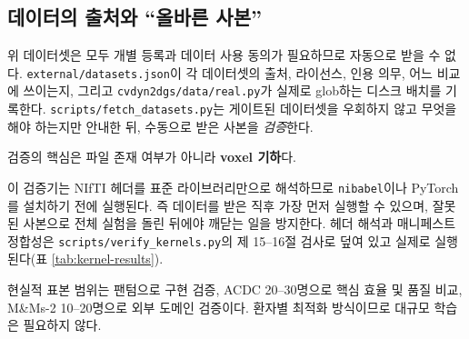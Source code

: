 
\subsection{데이터의 출처와 ``올바른 사본''}
\label{sec:data-provenance}

위 데이터셋은 모두 개별 등록과 데이터 사용 동의가 필요하므로 자동으로 받을 수 없다.
\texttt{external/datasets.json}이 각 데이터셋의 출처, 라이선스, 인용 의무, 어느 비교에
쓰이는지, 그리고 \texttt{cvdyn2dgs/data/real.py}가 실제로 glob하는 디스크 배치를
기록한다. \texttt{scripts/fetch\_datasets.py}는 게이트된 데이터셋을 우회하지 않고
무엇을 해야 하는지만 안내한 뒤, 수동으로 받은 사본을 \emph{검증}한다.

검증의 핵심은 파일 존재 여부가 아니라 \textbf{voxel 기하}다.


이 검증기는 NIfTI 헤더를 표준 라이브러리만으로 해석하므로 \texttt{nibabel}이나
PyTorch를 설치하기 전에 실행된다. 즉 데이터를 받은 직후 가장 먼저 실행할 수 있으며,
잘못된 사본으로 전체 실험을 돌린 뒤에야 깨닫는 일을 방지한다. 헤더 해석과 매니페스트
정합성은 \texttt{scripts/verify\_kernels.py}의 제 15--16절 검사로 덮여 있고 실제로
실행된다(표 \ref{tab:kernel-results}).

현실적 표본 범위는 팬텀으로 구현 검증, ACDC 20--30명으로 핵심 효율 및 품질 비교,
M\&Ms-2 10--20명으로 외부 도메인 검증이다. 환자별 최적화 방식이므로 대규모 학습은
필요하지 않다.

